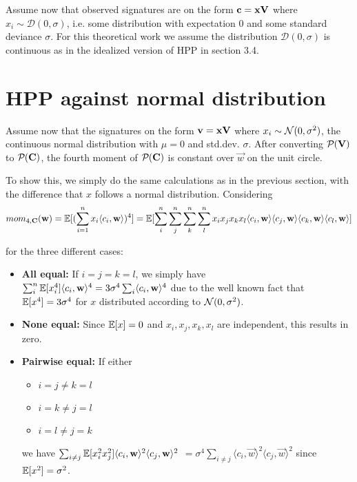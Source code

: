 Assume now that observed signatures are on the form $\mathbf{c} = \mathbf{x} \mathbf{V}$ where $x_i \sim \mathcal{D}(0, \sigma)$, i.e. some distribution with expectation 0 and some standard deviance $\sigma$.
For this theoretical work we assume the distribution $\mathcal{D}(0, \sigma)$ is continuous as in the idealized version of HPP in section 3.4.

\section{HPP against normal distribution}
Assume now that the signatures on the form $\mathbf{v} = \mathbf{x} \mathbf{V}$ where $x_i \sim \mathcal{N}(0, \sigma^2)$, the continuous normal distribution with $\mu = 0$ and std.dev. $\sigma$. 
After converting $\mathcal{P}_{}(\mathbf{V})$ to $\mathcal{P}_{}(\mathbf{C})$, the fourth moment of $\mathcal{P}_{}(\mathbf{C})$ is constant over $\vec{w}$ on the unit circle.

    To show this, we simply do the same calculations as in the previous section, with the difference that $x$ follows a normal distribution.
    Considering
    \[ mom_{4, \mathbf{C}}(\mathbf{w}) = \mathbb{E}[(\sum_{i=1}^{n} x_i \langle c_i, \mathbf{w} \rangle ) ^4] = 
        \mathbb{E}[\sum_{i}^{n} \sum_{j}^{n} \sum_{k}^{n} \sum_{l}^{n} x_i x_j x_k x_l 
        \langle c_i, \mathbf{w} \rangle \langle c_j, \mathbf{w} \rangle
    \langle c_k, \mathbf{w} \rangle \langle c_l, \mathbf{w} \rangle] \]

    for the three different cases:
    \begin{itemize}
        \item \textbf{All equal: } If $i = j = k = l$, we simply have $\sum_i^n \mathbb{E}[x_i^4] \langle c_i, \mathbf{w} \rangle ^4 = 3 \sigma ^4 \sum_i \langle c_i, \mathbf{w} \rangle ^4$
            due to the well known fact that $\mathbb{E}[x^4] = 3 \sigma ^4$ for $x$ distributed according to $\mathcal{N}(0, \sigma^2)$.
        \item \textbf{None equal:} Since $\mathbb{E}[x] = 0$ and $x_i, x_j, x_k, x_l$ are independent, this results in zero.
        \item \textbf{Pairwise equal:} If either 
            \begin{itemize}
                \item $i = j \neq k = l$
                \item $i = k \neq j = l$ 
                \item $i = l \neq j = k$
            \end{itemize}
            we have $\sum_{i \neq j} \mathbb{E}[x_i^2 x_j^2] \langle c_i, \mathbf{w} \rangle ^2 \langle c_j, \mathbf{w} \rangle ^2$
            $= \sigma^4 \sum_{i \neq j}\langle c_i, \vec{w} \rangle ^2 \langle c_j, \vec{w} \rangle ^2$ since $\mathbb{E}[x^2] = \sigma^2$.
    \end{itemize}

